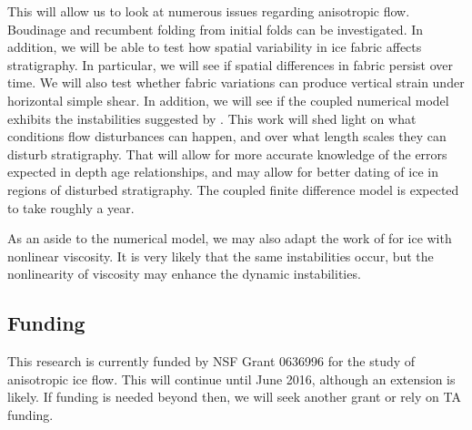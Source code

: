 \documentclass{report}
\begin{document}
This will allow us to look at numerous issues regarding anisotropic flow. Boudinage and recumbent folding from initial folds can be investigated. In addition, we will be able to test how spatial variability in ice fabric affects stratigraphy. In particular, we will see if spatial differences in fabric persist over time. We will also test whether fabric variations can produce vertical strain under horizontal simple shear. In addition, we will see if the coupled numerical model exhibits the instabilities suggested by \citet{montgomery-smith2011}. This work will shed light on what conditions flow disturbances can happen, and over what length scales they can disturb stratigraphy. That will allow for more accurate knowledge of the errors expected in depth age relationships, and may allow for better dating of ice in regions of disturbed stratigraphy. The coupled finite difference model is expected to take roughly a year.

As an aside to the numerical model, we may also adapt the work of \citet{montgomery-smith2011} for ice with nonlinear viscosity. It is very likely that the same instabilities occur, but the nonlinearity of viscosity may enhance the dynamic instabilities.

\subsection{Funding}
This research is currently funded by NSF Grant 0636996 for the study of anisotropic ice flow. This will continue until June 2016, although an extension is likely. If funding is needed beyond then, we will seek another grant or rely on TA funding. 



\end{document}
